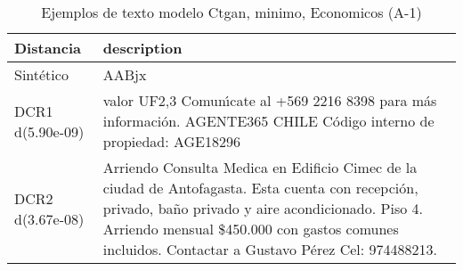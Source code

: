 \begin{table}[H]
\centering
\fontsize{10}{14}\selectfont
\caption{Ejemplos de texto modelo Ctgan, minimo, Economicos (A-1)}
\label{table-example-economicos-a-1-ctgan-min-text}
\begin{tabular}{|l|m{35em}|}
\hline
\rowcolor[gray]{0.8}
Distancia & description \\
\hline Sintético & AABjx \\
\hline DCR1 d(5.90e-09) & valor UF2,3 Comun{\'\i}cate al +569 2216 8398 para m\'as informaci\'on. AGENTE365 CHILE C\'odigo interno de propiedad: AGE18296 \\
\hline DCR2 d(3.67e-08) & Arriendo Consulta Medica en Edificio Cimec de la ciudad de Antofagasta. Esta cuenta con recepci\'on, privado, ba\~no privado y aire acondicionado. Piso 4. Arriendo mensual \$450.000 con gastos comunes incluidos.
Contactar a Gustavo P\'erez Cel: 974488213. \\
\hline
\end{tabular}
\end{table}
